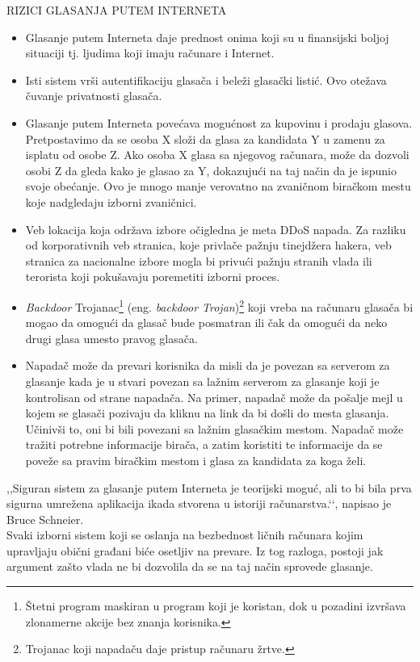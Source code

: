 \documentclass[a4paper]{article}
\theoremstyle{break}
\begin{document}
{\noindent RIZICI GLASANJA PUTEM INTERNETA
\begin{itemize}
\item Glasanje putem Interneta daje prednost onima koji su u finansijski boljoj situaciji tj. ljudima koji imaju računare i Internet.
\item Isti sistem vrši autentifikaciju glasača i beleži glasački listić. Ovo otežava čuvanje privatnosti glasača.
\item Glasanje putem Interneta povećava mogućnost za kupovinu i prodaju glasova. Pretpostavimo da se osoba X složi da glasa za kandidata Y u zamenu za isplatu od osobe Z. Ako osoba X glasa sa njegovog računara, može da dozvoli osobi Z da gleda kako je glasao za Y, dokazujući na taj način da je ispunio svoje obećanje. Ovo je mnogo manje verovatno na zvaničnom biračkom mestu koje nadgledaju izborni zvaničnici.
\item Veb lokacija koja održava izbore očigledna je meta DDoS napada. Za razliku od korporativnih veb stranica, koje privlače pažnju tinejdžera hakera, veb stranica za nacionalne izbore mogla bi privući pažnju stranih vlada ili terorista koji pokušavaju poremetiti izborni proces.
\item \textit{Backdoor} Trojanac\footnote{Štetni program maskiran u program koji je koristan, dok u pozadini izvršava zlonamerne akcije bez znanja korisnika.} (eng. {\em backdoor Trojan})\footnote{Trojanac koji napadaču daje pristup računaru žrtve.} koji vreba na računaru glasača bi mogao da omogući da glasač bude posmatran ili čak da omogući da neko drugi glasa umesto pravog glasača.
\item Napadač može da prevari korisnika da misli da je povezan sa serverom za glasanje kada je u stvari povezan sa lažnim serverom za glasanje koji je kontrolisan od strane napadača. Na primer, napadač može da pošalje mejl u kojem se glasači pozivaju da kliknu na link da bi došli do mesta glasanja. Učinivši to, oni bi bili povezani sa lažnim glasačkim mestom. Napadač može tražiti potrebne informacije birača, a zatim koristiti te informacije da se poveže sa pravim biračkim mestom i glasa za kandidata za koga želi.
\end{itemize}

,,Siguran sistem za glasanje putem Interneta je teorijski moguć, ali to bi bila prva sigurna umrežena aplikacija ikada stvorena u istoriji računarstva.‘‘, napisao je Bruce Schneier\cite{online_voting}.\\
\indent Svaki izborni sistem koji se oslanja na bezbednost ličnih računara kojim upravljaju obični građani biće osetljiv na prevare. Iz tog razloga, postoji jak argument zašto vlada ne bi dozvolila da se na taj način sprovede glasanje.

}
\end{document}
